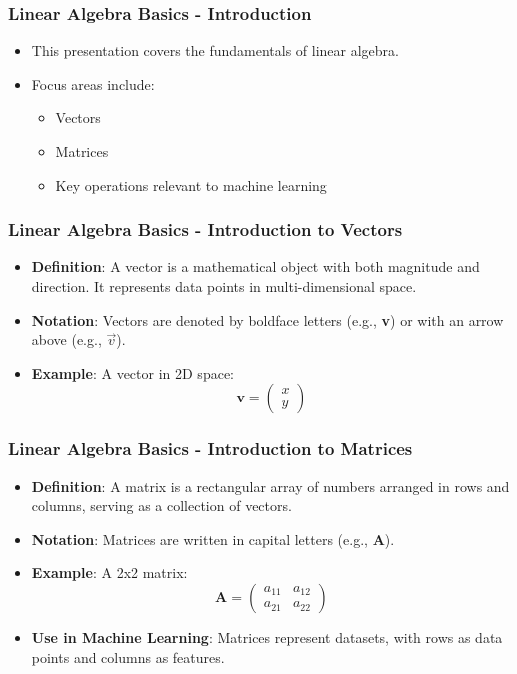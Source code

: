 \documentclass[aspectratio=169]{beamer}
\begin{document}
\begin{frame}[fragile]
    \frametitle{Linear Algebra Basics - Introduction}
    \begin{itemize}
        \item This presentation covers the fundamentals of linear algebra.
        \item Focus areas include:
        \begin{itemize}
            \item Vectors
            \item Matrices
            \item Key operations relevant to machine learning
        \end{itemize}
    \end{itemize}
\end{frame}

\begin{frame}[fragile]
    \frametitle{Linear Algebra Basics - Introduction to Vectors}
    \begin{itemize}
        \item \textbf{Definition}: A vector is a mathematical object with both magnitude and direction. It represents data points in multi-dimensional space.
        \item \textbf{Notation}: Vectors are denoted by boldface letters (e.g., \textbf{v}) or with an arrow above (e.g., $\vec{v}$).
        \item \textbf{Example}: A vector in 2D space:
        \[
        \mathbf{v} = \begin{pmatrix}
        x \\
        y
        \end{pmatrix}
        \]
    \end{itemize}
\end{frame}

\begin{frame}[fragile]
    \frametitle{Linear Algebra Basics - Introduction to Matrices}
    \begin{itemize}
        \item \textbf{Definition}: A matrix is a rectangular array of numbers arranged in rows and columns, serving as a collection of vectors.
        \item \textbf{Notation}: Matrices are written in capital letters (e.g., \textbf{A}).
        \item \textbf{Example}: A 2x2 matrix:
        \[
        \mathbf{A} = \begin{pmatrix}
        a_{11} & a_{12} \\
        a_{21} & a_{22}
        \end{pmatrix}
        \]
        \item \textbf{Use in Machine Learning}: Matrices represent datasets, with rows as data points and columns as features.
    \end{itemize}
\end{frame}
\end{document}
